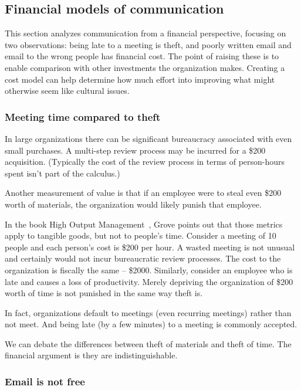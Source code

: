 \subsection*{Financial models of communication\label{sec:financial-models-of-communication}}

This section analyzes communication from a financial perspective, focusing on two observations:
being late to a meeting is theft, 
and poorly written email and email to the wrong people has financial cost.
The point of raising these is to enable comparison with other investments the organization makes. Creating a cost model can help determine how much effort into improving what might otherwise seem like cultural issues.

\subsubsection*{Meeting time compared to theft}

In large organizations there can be significant bureaucracy associated with even small purchases. A multi-step review process may be incurred for a \$200 acquisition. (Typically the cost of the review process in terms of person-hours spent isn't part of the calculus.)

Another measurement of value is that if an employee were to steal even \$200 worth of materials, the organization would likely punish that employee.

In the book High Output Management~\cite{1995_Grove}, Grove points out that those metrics apply to tangible goods, but not to people's time. Consider a meeting of 10 people and each person's cost is \$200 per hour. 
A wasted meeting is not unusual and certainly would not incur bureaucratic review processes. The cost to the organization is fiscally the same -- \$2000. Similarly, consider an employee who is late and causes a loss of productivity. Merely depriving the organization of \$200 worth of time is not punished in the same way theft is.

In fact, organizations default to meetings (even recurring meetings) rather than not meet. And being late (by a few minutes) to a meeting is commonly accepted. 

We can debate the differences between theft of materials and theft of time. The financial argument is they are indistinguishable. 


\subsubsection*{Email is not free}


